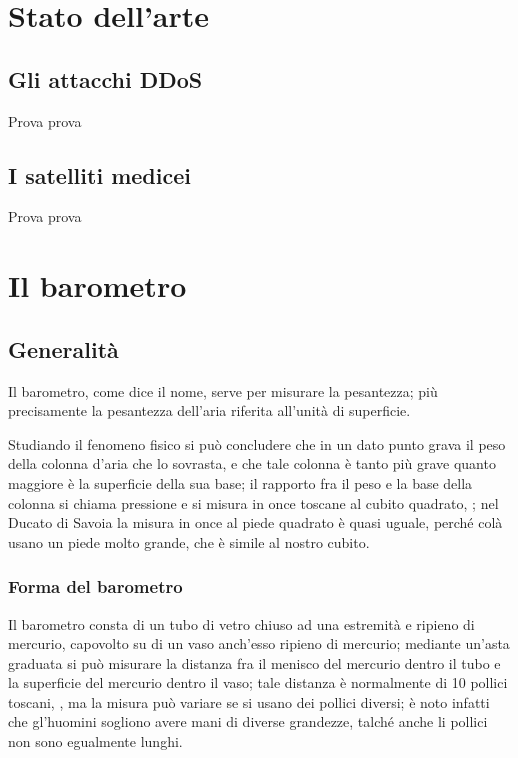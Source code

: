 
\chapter{Stato dell'arte}

\section{Gli attacchi DDoS}
Prova prova

\section{I satelliti medicei}
Prova prova

\chapter{Il barometro}
\section{Generalit\`a}
\begin{interlinea}{0.87} Il barometro, come dice il nome, serve per
misurare la pesantezza; pi\`u precisamente la pesantezza dell'aria
riferita all'unit\`a di superficie.
\end{interlinea}

\begin{interlinea}{2} Studiando il fenomeno fisico si pu\`o concludere
che in un dato punto grava il peso della colonna d'aria che lo
sovrasta, e che tale colonna \`e tanto pi\`u grave quanto maggiore
\`e la superficie della sua base; il rapporto fra il peso e la base
della colonna si chiama pressione e si misura in once toscane al cubito
quadrato, \cite{tor1}; nel Ducato di Savoia la misura in once al piede
quadrato \`e quasi uguale, perch\'e col\`a usano un piede molto
grande, che \`e simile al nostro cubito.
\end{interlinea}

\subsection{Forma del barometro}
Il barometro consta di un tubo di vetro chiuso ad una estremit\`a e
ripieno di mercurio, capovolto su di un vaso anch'esso ripieno di
mercurio; mediante un'asta graduata si pu\`o misurare la distanza fra
il menisco del mercurio dentro il tubo e la superficie del mercurio
dentro il vaso; tale distanza \`e normalmente di 10 pollici toscani,
\cite{tor1,tor2}, ma la misura pu\`o variare se si usano dei pollici
diversi; \`e noto infatti che gl'huomini sogliono avere mani di
diverse grandezze, talch\'e anche li pollici non sono egualmente
lunghi.
